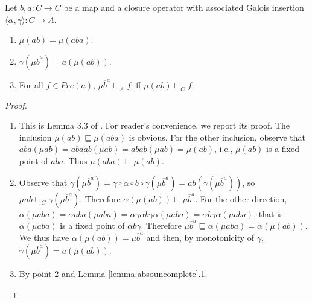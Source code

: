 \documentclass{llncs}
\begin{document}
\begin{lemma}
Let $b,a\colon C \to C$ be a map and a closure operator with associated Galois insertion $\langle \alpha, \gamma \rangle \colon C \to A$.
\begin{enumerate}
\item $\mu (ab) = \mu(aba)$. 
\item $\gamma (\mu \overline{b}^a) = a(\mu (ab))$.
\item For all $f\in Pre(a)$, $\mu \overline{b}^a \sqsubseteq_A f$ iff $\mu (ab)\sqsubseteq_C f$.
\end{enumerate}
\end{lemma}
\begin{proof}
\begin{enumerate}
\item This is Lemma 3.3 of \cite{DBLP:journals/jacm/GiacobazziRS00}. For reader's convenience, we report its proof.
The inclusion $\mu(ab)\sqsubseteq \mu(aba)$ is obvious. For the other inclusion, observe that $aba(\mu ab)= aba ab (\mu ab)=abab(\mu ab) = \mu (ab)$, i.e.,  $\mu(ab)$ is a fixed point of $aba$. Thus $\mu(aba)\sqsubseteq \mu(ab)$.
%
\item Observe that $\gamma (\mu \overline{b}^a)= \gamma \circ  \alpha \circ b \circ \gamma (\mu \overline{b}^a) = ab (\gamma (\mu \overline{b}^a))$, so $\mu ab \sqsubseteq_C \gamma (\mu \overline{b}^a)$. Therefore $\alpha(\mu (ab)) \sqsubseteq \mu \overline{b}^a$.
%
For the other direction,  $\alpha(\mu aba)=\alpha aba(\mu aba)= \alpha \gamma \alpha b \gamma \alpha (\mu aba) = \alpha b \gamma \alpha (\mu aba)$, that is $\alpha (\mu aba)$ is a fixed point of $\alpha b \gamma$. Therefore $\mu \overline{b}^a \sqsubseteq \alpha(\mu aba) = \alpha (\mu (ab))$.
%
We thus have  $\alpha(\mu (ab)) = \mu \overline{b}^a$ and then, by monotonicity of $\gamma$,  $\gamma (\mu \overline{b}^a) = a(\mu (ab))$.
\item By point 2 and Lemma \ref{lemma:absouncomplete}.1.
\end{enumerate}
\end{proof}
\end{document}
